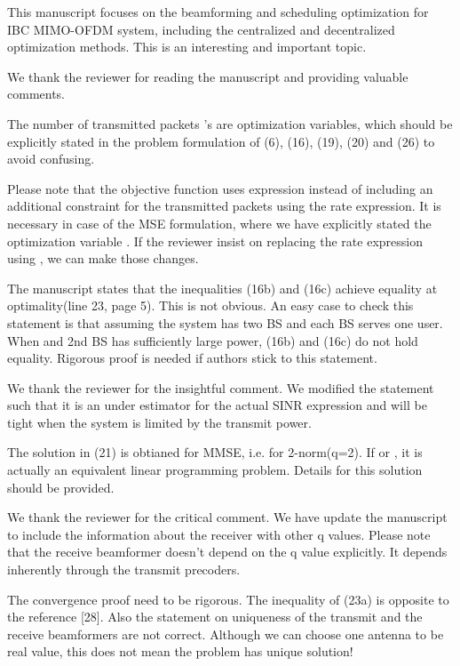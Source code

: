 \begin{itemize}

 This manuscript focuses on the beamforming and scheduling optimization for IBC MIMO-OFDM system, including the centralized and decentralized optimization methods. This is an interesting and important topic.

\resp We thank the reviewer for reading the manuscript and providing valuable comments.

 The number of transmitted packets 's are optimization variables, which should be explicitly stated in the problem formulation of (6), (16), (19), (20) and (26) to avoid confusing.

\resp Please note that the objective function uses  expression instead of including an additional constraint for the transmitted packets using the rate expression. It is necessary in case of the MSE formulation, where we have explicitly stated the optimization variable . If the reviewer insist on replacing the rate expression using , we can make those changes.

 The manuscript states that the inequalities (16b) and (16c) achieve equality at optimality(line 23, page 5). This is not obvious. An easy case to check this statement is that assuming the system has two BS and each BS serves one user. When  and 2nd BS has sufficiently large power, (16b) and (16c) do not hold equality. Rigorous proof is needed if authors stick to this statement.

\resp We thank the reviewer for the insightful comment. We modified the statement such that it is an under estimator for the actual SINR expression and will be tight when the system is limited by the transmit power.

 The solution in (21) is obtianed for MMSE, i.e. for 2-norm(q=2). If  or , it is actually an equivalent linear programming problem. Details for this solution should be provided.

\resp We thank the reviewer for the critical comment. We have update the manuscript to include the information about the receiver with other q values. Please note that the receive beamformer doesn't depend on the q value explicitly. It depends inherently through the transmit precoders.

 The convergence proof need to be rigorous. The inequality of (23a) is opposite to the reference [28]. Also the statement on uniqueness of the transmit and the receive beamformers are not correct. Although we can choose one antenna to be real value, this does not mean the problem has unique solution!


\end{itemize}
